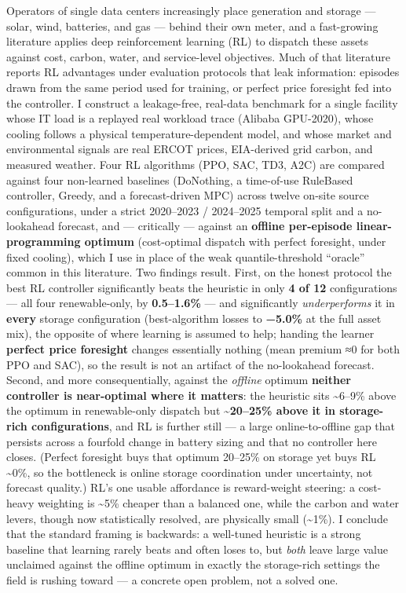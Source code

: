 \documentclass[
  11pt,
]{article}
\begin{document}
Operators of single data centers increasingly place generation and
storage --- solar, wind, batteries, and gas --- behind their own meter,
and a fast-growing literature applies deep reinforcement learning (RL)
to dispatch these assets against cost, carbon, water, and service-level
objectives. Much of that literature reports RL advantages under
evaluation protocols that leak information: episodes drawn from the same
period used for training, or perfect price foresight fed into the
controller. I construct a leakage-free, real-data benchmark for a single
facility whose IT load is a replayed real workload trace (Alibaba
GPU-2020), whose cooling follows a physical temperature-dependent model,
and whose market and environmental signals are real ERCOT prices,
EIA-derived grid carbon, and measured weather. Four RL algorithms (PPO,
SAC, TD3, A2C) are compared against four non-learned baselines
(DoNothing, a time-of-use RuleBased controller, Greedy, and a
forecast-driven MPC) across twelve on-site source configurations, under
a strict 2020--2023 / 2024--2025 temporal split and a no-lookahead
forecast, and --- critically --- against an \textbf{offline per-episode
linear-programming optimum} (cost-optimal dispatch with perfect
foresight, under fixed cooling), which I use in place of the weak
quantile-threshold ``oracle'' common in this literature. Two findings
result. First, on the honest protocol the best RL controller
significantly beats the heuristic in only \textbf{4 of 12}
configurations --- all four renewable-only, by \textbf{0.5--1.6\%} ---
and significantly \emph{underperforms} it in \textbf{every} storage
configuration (best-algorithm losses to \textbf{−5.0\%} at the full
asset mix), the opposite of where learning is assumed to help; handing
the learner \textbf{perfect price foresight} changes essentially nothing
(mean premium ≈0 for both PPO and SAC), so the result is not an artifact
of the no-lookahead forecast. Second, and more consequentially, against
the \emph{offline} optimum \textbf{neither controller is near-optimal
where it matters}: the heuristic sits \textasciitilde6--9\% above the
optimum in renewable-only dispatch but \textbf{\textasciitilde20--25\%
above it in storage-rich configurations}, and RL is further still --- a
large online-to-offline gap that persists across a fourfold change in
battery sizing and that no controller here closes. (Perfect foresight
buys that optimum 20--25\% on storage yet buys RL \textasciitilde0\%, so
the bottleneck is online storage coordination under uncertainty, not
forecast quality.) RL's one usable affordance is reward-weight steering:
a cost-heavy weighting is \textasciitilde5\% cheaper than a balanced
one, while the carbon and water levers, though now statistically
resolved, are physically small (\textasciitilde1\%). I conclude that the
standard framing is backwards: a well-tuned heuristic is a strong
baseline that learning rarely beats and often loses to, but \emph{both}
leave large value unclaimed against the offline optimum in exactly the
storage-rich settings the field is rushing toward --- a concrete open
problem, not a solved one.
\end{document}
